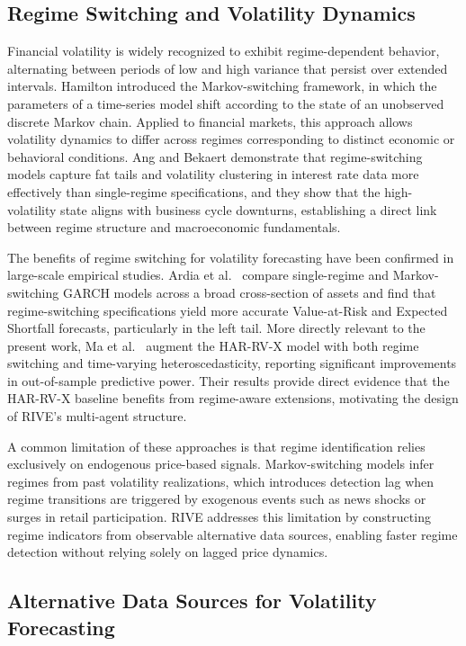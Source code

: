 \documentclass[review]{elsarticle}
\begin{document}
\subsection{Regime Switching and Volatility Dynamics}\label{regime-switching}

Financial volatility is widely recognized to exhibit regime-dependent behavior, alternating between periods of low and high variance that persist over extended intervals. Hamilton \cite{hamilton1989} introduced the Markov-switching framework, in which the parameters of a time-series model shift according to the state of an unobserved discrete Markov chain. Applied to financial markets, this approach allows volatility dynamics to differ across regimes corresponding to distinct economic or behavioral conditions. Ang and Bekaert \cite{ang2002} demonstrate that regime-switching models capture fat tails and volatility clustering in interest rate data more effectively than single-regime specifications, and they show that the high-volatility state aligns with business cycle downturns, establishing a direct link between regime structure and macroeconomic fundamentals.

The benefits of regime switching for volatility forecasting have been confirmed in large-scale empirical studies. Ardia et al.~\cite{ardia2018} compare single-regime and Markov-switching GARCH models across a broad cross-section of assets and find that regime-switching specifications yield more accurate Value-at-Risk and Expected Shortfall forecasts, particularly in the left tail. More directly relevant to the present work, Ma et al.~\cite{ma2019} augment the HAR-RV-X model with both regime switching and time-varying heteroscedasticity, reporting significant improvements in out-of-sample predictive power. Their results provide direct evidence that the HAR-RV-X baseline benefits from regime-aware extensions, motivating the design of RIVE's multi-agent structure.

A common limitation of these approaches is that regime identification relies exclusively on endogenous price-based signals. Markov-switching models infer regimes from past volatility realizations, which introduces detection lag when regime transitions are triggered by exogenous events such as news shocks or surges in retail participation. RIVE addresses this limitation by constructing regime indicators from observable alternative data sources, enabling faster regime detection without relying solely on lagged price dynamics.

\subsection{Alternative Data Sources for Volatility Forecasting}\label{alternative-data}
\end{document}
